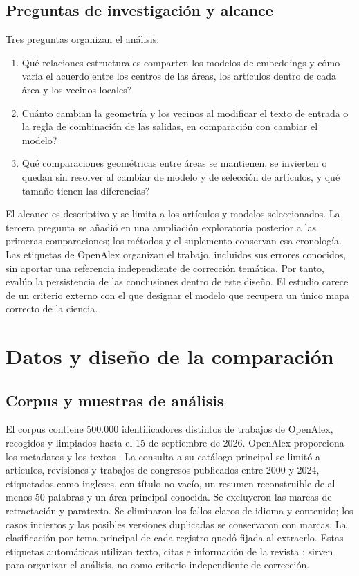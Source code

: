 \documentclass[12pt]{article}
\begin{document}
\subsection{Preguntas de investigación y alcance}
Tres preguntas organizan el análisis:

\begin{enumerate}
\item[\textbf{PI1.}] \textquestiondown{}Qué relaciones estructurales comparten los modelos de embeddings y cómo varía el acuerdo entre los centros de las áreas, los artículos dentro de cada área y los vecinos locales?
\item[\textbf{PI2.}] \textquestiondown{}Cuánto cambian la geometría y los vecinos al modificar el texto de entrada o la regla de combinación de las salidas, en comparación con cambiar el modelo?
\item[\textbf{PI3.}] \textquestiondown{}Qué comparaciones geométricas entre áreas se mantienen, se invierten o quedan sin resolver al cambiar de modelo y de selección de artículos, y qué tamaño tienen las diferencias?
\end{enumerate}

El alcance es descriptivo y se limita a los artículos y modelos seleccionados. La tercera pregunta se añadió en una ampliación exploratoria posterior a las primeras comparaciones; los métodos y el suplemento conservan esa cronología. Las etiquetas de OpenAlex organizan el trabajo, incluidos sus errores conocidos, sin aportar una referencia independiente de corrección temática. Por tanto, evalúo la persistencia de las conclusiones dentro de este diseño. El estudio carece de un criterio externo con el que designar el modelo que recupera un único mapa correcto de la ciencia.

\section{Datos y diseño de la comparación}
\subsection{Corpus y muestras de análisis}
El corpus contiene 500.000 identificadores distintos de trabajos de OpenAlex, recogidos y limpiados hasta el 15 de septiembre de 2026. OpenAlex proporciona los metadatos y los textos \citep{priem2022openalex}. La consulta a su catálogo principal se limitó a artículos, revisiones y trabajos de congresos publicados entre 2000 y 2024, etiquetados como ingleses, con título no vacío, un resumen reconstruible de al menos 50 palabras y un área principal conocida. Se excluyeron las marcas de retractación y paratexto. Se eliminaron los fallos claros de idioma y contenido; los casos inciertos y las posibles versiones duplicadas se conservaron con marcas. La clasificación por tema principal de cada registro quedó fijada al extraerlo. Estas etiquetas automáticas utilizan texto, citas e información de la revista \citep{openalex2026topics}; sirven para organizar el análisis, no como criterio independiente de corrección.
\end{document}
